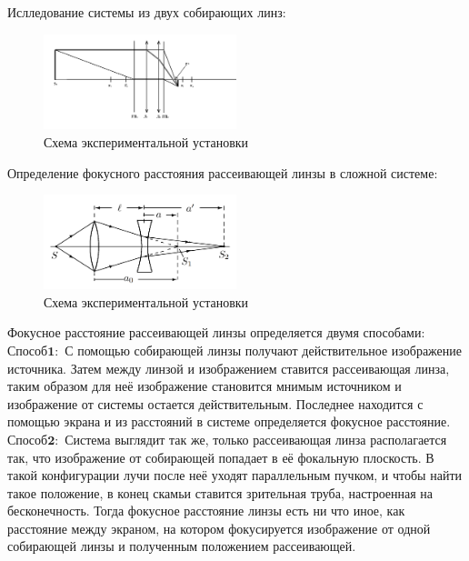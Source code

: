 Ислледование системы из двух собирающих линз:

\begin{figure}[H]
	\centering
	\includegraphics[width=0.5\textwidth]{../Изображения/Система собирающих.png}
	\caption{Схема экспериментальной установки}
\end{figure}


Определение фокусного расстояния рассеивающей линзы в сложной системе:

\begin{figure}[H]
	\centering
	\includegraphics[width=0.5\textwidth]{../Изображения/Фокус рассеивающей.png}
	\caption{Схема экспериментальной установки}
\end{figure}

Фокусное расстояние рассеивающей линзы определяется двумя способами:\\
$\mathbf{Способ 1:}$ С помощью собирающей линзы получают действительное изображение источника. Затем между линзой и изображением ставится рассеивающая линза, таким образом для неё изображение становится мнимым источником и изображение от системы остается действительным. Последнее находится с помощью экрана и из расстояний в системе определяется фокусное расстояние.\\
$\mathbf{Способ 2:}$ Система выглядит так же, только рассеивающая линза располагается так, что изображение от собирающей попадает в её фокальную плоскость. В такой конфигурации лучи после неё уходят параллельным пучком, и чтобы найти такое положение, в конец скамьи ставится зрительная труба, настроенная на бесконечность. Тогда фокусное расстояние линзы есть ни что иное, как расстояние между экраном, на котором фокусируется изображение от одной собирающей линзы и полученным положением рассеивающей.\\
